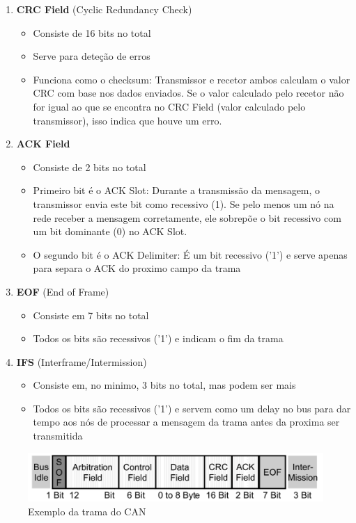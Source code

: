 \documentclass[a4paper, 12pt, onecolumn, oneside]{scrartcl}
\begin{document}
\begin{enumerate}
\begin{itemize}
    \end{itemize}
    \item \textbf{CRC Field} (Cyclic Redundancy Check)
    \begin{itemize}
        \item Consiste de 16 bits no total
        \item Serve para deteção de erros
        \item Funciona como o checksum: Transmissor e recetor ambos calculam o valor CRC com base nos dados enviados. Se o valor calculado pelo recetor não for igual
        ao que se encontra no CRC Field (valor calculado pelo transmissor), isso indica que houve um erro.\\
    \end{itemize}
    \item \textbf{ACK Field}
    \begin{itemize}
        \item Consiste de 2 bits no total
        \item Primeiro bit é o ACK Slot: Durante a transmissão da mensagem, o transmissor envia este bit como recessivo (1). Se pelo menos um nó na rede receber a mensagem 
        corretamente, ele sobrepõe o bit recessivo com um bit dominante (0) no ACK Slot.
        \item O segundo bit é o ACK Delimiter: É um bit recessivo ('1') e serve apenas para separa o ACK do proximo campo da trama
    \end{itemize}
    \item \textbf{EOF} (End of Frame)
    \begin{itemize}
        \item Consiste em 7 bits no total
        \item Todos os bits são recessivos ('1') e indicam o fim da trama
    \end{itemize}
    \item \textbf{IFS} (Interframe/Intermission)
    \begin{itemize}
        \item Consiste em, no minimo, 3 bits no total, mas podem ser mais
        \item Todos os bits são recessivos ('1') e servem como um delay no bus para dar tempo aos nós de processar a mensagem da trama antes da proxima ser transmitida
    \end{itemize}
\end{enumerate}  

\begin{figure}[H]
    \centering
    \includegraphics[width=1\textwidth]{Trama-exemplo_CAN.png}
    \caption{Exemplo da trama do CAN}\label{fig5}
\end{figure}
\end{document}
